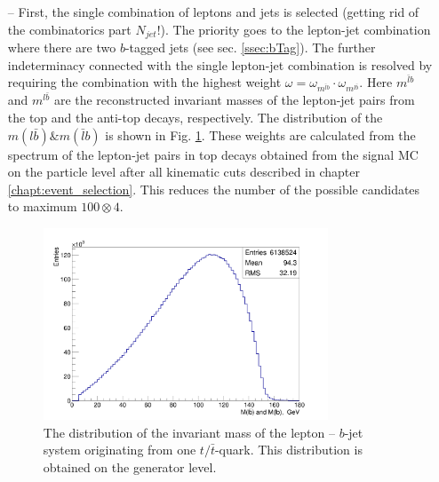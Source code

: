 \begin{itemize}

 \item [--] First, the single combination of leptons and jets is selected (getting rid of the combinatorics part $N_{jet}!$). The priority goes to
 the lepton-jet combination where there are two $b$-tagged jets (see sec. \ref{ssec:bTag}). The further indeterminacy connected with the single lepton-jet
 combination is resolved by requiring the combination with the highest weight $\omega = \omega_{m^{\bar{l}b}} \cdot \omega_{m^{l\bar{b}}}$. Here 
 $m^{\bar{l}b}$ and $m^{l\bar{b}}$ are the reconstructed invariant masses of the lepton-jet pairs from the top and the anti-top 
 decays, respectively. The distribution of the $m(l\bar{b}) \& m(\bar{l}b)$ is shown in Fig. \ref{fig:mlb}. 
 These weights are calculated from the spectrum of the lepton-jet pairs in top decays obtained from the signal MC on the 
 particle level after all kinematic cuts described in chapter \ref{chapt:event_selection}. This reduces the number of the possible candidates to maximum
 $100 \otimes 4$.
 
 \begin{figure}[t]
  \centering
  \includegraphics[width=0.8\textwidth]{05_kinReco/plots/mlb_distr.png}
  \caption{The distribution of the invariant mass of the lepton -- $b$-jet system originating from one $t/\bar{t}$-quark. This distribution is obtained on the
  generator level.}
  \label{fig:mlb}
 \end{figure}
 

\end{itemize}
